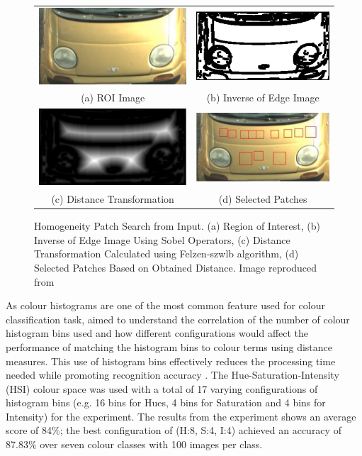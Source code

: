 \begin{figure}[!htb]
  \centering
\begin{tabular}{cc}
 \includegraphics[width=0.3\linewidth]{image/lit/homo1.png}  &
 \includegraphics[width=0.3\linewidth]{image/lit/homo3.png} \\
(a) ROI Image &
(b) Inverse of Edge Image \\
 \includegraphics[width=0.3\linewidth]{image/lit/homo2.png} & 
 \includegraphics[width=0.3\linewidth]{image/lit/homo4.png} \\
(c) Distance Transformation &
(d) Selected Patches\\
\end{tabular}
\caption[Homogeneity Patch Search from Input. (a) Region of Interest, (b) Inverse of Edge Image Using Sobel Operators, (c) Distance Transformation Calculated using Felzen-szwlb algorithm, (d) Selected Patches Based on Obtained Distance.]{Homogeneity Patch Search from Input. (a) Region of Interest, (b) Inverse of Edge Image Using Sobel Operators, (c) Distance Transformation Calculated using Felzen-szwlb algorithm, (d) Selected Patches Based on Obtained Distance. Image reproduced from  \label{fig:colorpatches}}
\end{figure}

As colour histograms are one of the most common feature used for colour classification task,  aimed to understand the correlation of the number of colour histogram bins used and how different configurations would affect the performance of matching the histogram bins to colour terms using distance measures. This use of histogram bins effectively reduces the processing time needed while promoting recognition accuracy \cite{zhang2017vehicle}. The Hue-Saturation-Intensity (HSI) colour space was used with a total of 17 varying configurations of histogram bins (e.g. 16 bins for Hues, 4 bins for Saturation and 4 bins for Intensity) for the experiment. The results from the experiment shows an average score of 84\%; the best configuration of (H:8, S:4, I:4) achieved an accuracy of 87.83\% over seven colour classes with 100 images per class. 

